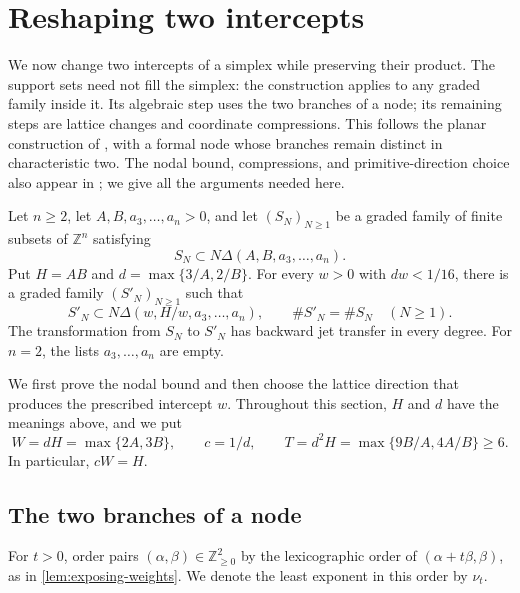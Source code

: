 \section{Reshaping two intercepts}\label{sec:reshape}

We now change two intercepts of a simplex while preserving their product. The support sets need not fill the simplex: the construction applies to any graded family inside it.  Its algebraic step uses the two branches of a node; its remaining steps are lattice changes and coordinate compressions. This follows the planar construction of \textcite[Section~4, Proposition~4.1]{OpenAI2026Higher}, with a formal node whose branches remain distinct in characteristic two.  The nodal bound, compressions, and primitive-direction choice also appear in \textcite[Propositions~3.2 and~3.4, Lemma~4.3]{OpenAI2026Surfaces}; we give all the arguments needed here.

\begin{proposition}\label{prop:reshape}
Let $n\ge2$, let $A,B,a_3,\ldots,a_n>0$, and let $(S_N)_{N\ge1}$ be a graded family of finite subsets of $\mathbb{Z}^n$ satisfying
\[
 S_N\subset N\Delta(A,B,a_3,\ldots,a_n).
\]
Put $H=AB$ and $d=\max\{3/A,2/B\}$.  For every $w>0$ with $dw<1/16$, there is a graded family $(S'_N)_{N\ge1}$ such that
\[
 S'_N\subset N\Delta(w,H/w,a_3,\ldots,a_n),
 \qquad \#S'_N=\#S_N \quad(N\ge1).
\]
The transformation from $S_N$ to $S'_N$ has backward jet transfer in every degree.  For $n=2$, the lists $a_3,\ldots,a_n$ are empty.
\end{proposition}

We first prove the nodal bound and then choose the lattice direction that produces the prescribed intercept $w$.  Throughout this section, $H$ and $d$ have the meanings above, and we put
\begin{equation}\label{eq:reshape-constants}
 W=dH=\max\{2A,3B\},\qquad c=1/d,\qquad
 T=d^2H=\max\{9B/A,4A/B\}\ge6.
\end{equation}
In particular, $cW=H$.

\subsection{The two branches of a node}

For $t>0$, order pairs $(\alpha,\beta)\in\mathbb{Z}_{\ge0}^2$ by the lexicographic order of $(\alpha+t\beta,\beta)$, as in \cref{lem:exposing-weights}.  We denote the least exponent in this order by $\nu_t$.

